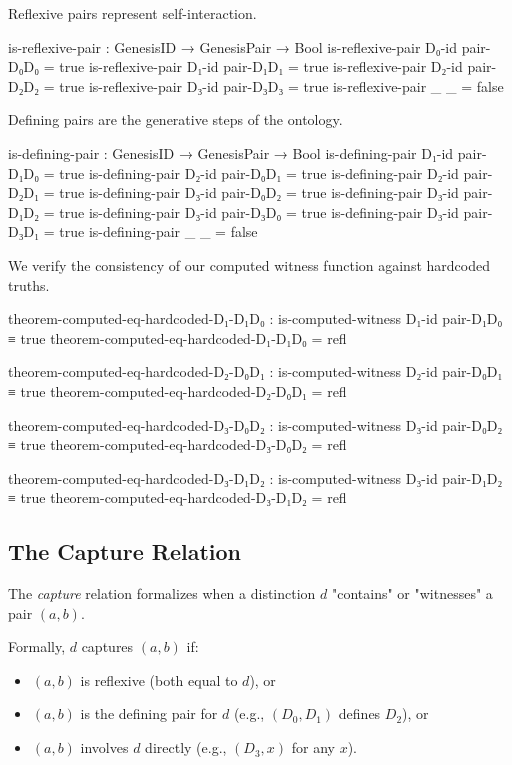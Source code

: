 \documentclass[11pt,a4paper]{book}
\begin{document}
Reflexive pairs represent self-interaction.

\begin{code}
is-reflexive-pair : GenesisID → GenesisPair → Bool
is-reflexive-pair D₀-id pair-D₀D₀ = true
is-reflexive-pair D₁-id pair-D₁D₁ = true
is-reflexive-pair D₂-id pair-D₂D₂ = true
is-reflexive-pair D₃-id pair-D₃D₃ = true
is-reflexive-pair _     _         = false
\end{code}

Defining pairs are the generative steps of the ontology.

\begin{code}
is-defining-pair : GenesisID → GenesisPair → Bool
is-defining-pair D₁-id pair-D₁D₀ = true
is-defining-pair D₂-id pair-D₀D₁ = true
is-defining-pair D₂-id pair-D₂D₁ = true
is-defining-pair D₃-id pair-D₀D₂ = true
is-defining-pair D₃-id pair-D₁D₂ = true
is-defining-pair D₃-id pair-D₃D₀ = true
is-defining-pair D₃-id pair-D₃D₁ = true
is-defining-pair _     _         = false

\end{code}

We verify the consistency of our computed witness function against hardcoded truths.

\begin{code}
theorem-computed-eq-hardcoded-D₁-D₁D₀ : is-computed-witness D₁-id pair-D₁D₀ ≡ true
theorem-computed-eq-hardcoded-D₁-D₁D₀ = refl

theorem-computed-eq-hardcoded-D₂-D₀D₁ : is-computed-witness D₂-id pair-D₀D₁ ≡ true
theorem-computed-eq-hardcoded-D₂-D₀D₁ = refl

theorem-computed-eq-hardcoded-D₃-D₀D₂ : is-computed-witness D₃-id pair-D₀D₂ ≡ true
theorem-computed-eq-hardcoded-D₃-D₀D₂ = refl

theorem-computed-eq-hardcoded-D₃-D₁D₂ : is-computed-witness D₃-id pair-D₁D₂ ≡ true
theorem-computed-eq-hardcoded-D₃-D₁D₂ = refl

\end{code}

\subsection{The Capture Relation}

The \emph{capture} relation formalizes when a distinction $d$ "contains" or "witnesses" a pair $(a, b)$.

Formally, $d$ captures $(a, b)$ if:
\begin{itemize}
\item $(a, b)$ is reflexive (both equal to $d$), or
\item $(a, b)$ is the defining pair for $d$ (e.g., $(D_0, D_1)$ defines $D_2$), or
\item $(a, b)$ involves $d$ directly (e.g., $(D_3, x)$ for any $x$).
\end{itemize}
\end{document}
